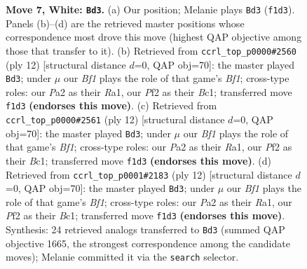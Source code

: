 \documentclass[11pt]{article}
\begin{document}
\begin{figure}[p]
\caption{\textbf{Move 7, White: \texttt{Bd3}.} (a) Our position; Melanie plays \texttt{Bd3} (\texttt{f1d3}). Panels (b)--(d) are the retrieved master positions whose correspondence most drove this move (highest QAP objective among those that transfer to it). (b) Retrieved from \texttt{ccrl\_top\_p0000\#2560} (ply 12) [structural distance $d$=0, QAP obj=70]: the master played \texttt{Bd3}; under $\mu$ our \emph{Bf1} plays the role of that game's \emph{Bf1}; cross-type roles: our \emph{P}a2 as their \emph{R}a1, our \emph{P}f2 as their \emph{B}c1; transferred move \texttt{f1d3} \textbf{(endorses this move)}. (c) Retrieved from \texttt{ccrl\_top\_p0000\#2561} (ply 12) [structural distance $d$=0, QAP obj=70]: the master played \texttt{Bd3}; under $\mu$ our \emph{Bf1} plays the role of that game's \emph{Bf1}; cross-type roles: our \emph{P}a2 as their \emph{R}a1, our \emph{P}f2 as their \emph{B}c1; transferred move \texttt{f1d3} \textbf{(endorses this move)}. (d) Retrieved from \texttt{ccrl\_top\_p0001\#2183} (ply 12) [structural distance $d$=0, QAP obj=70]: the master played \texttt{Bd3}; under $\mu$ our \emph{Bf1} plays the role of that game's \emph{Bf1}; cross-type roles: our \emph{P}a2 as their \emph{R}a1, our \emph{P}f2 as their \emph{B}c1; transferred move \texttt{f1d3} \textbf{(endorses this move)}. Synthesis: 24 retrieved analogs transferred to \texttt{Bd3} (summed QAP objective 1665, the strongest correspondence among the candidate moves); Melanie committed it via the \texttt{search} selector.}
\label{fig:thought-m12}
\end{figure}

\clearpage
\end{document}

